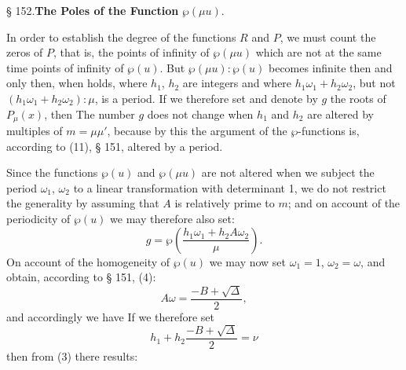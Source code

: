 
\begin{center}
§ 152.\qquad \textbf{The Poles of the Function} $\wp(\mu u)$.
\end{center}

In order to establish the degree of the functions $R$ and $P$, we must count the zeros of $P$, that is, the points of infinity of $\wp(\mu u)$ which are not at the same time points of infinity of $\wp(u)$. But $\wp(\mu u):\wp(u)$ becomes infinite then and only then, when
holds, where $h_1$, $h_2$ are integers and where $h_1\omega_1 + h_2\omega_2$, but not $(h_1\omega_1+h_2\omega_2):\mu$, is a period. If we therefore set
and denote by $g$ the roots of $P_\mu(x)$, then
The number $g$ does not change when $h_1$ and $h_2$ are altered by multiples of $m=\mu\mu'$, because by this the argument of the $\wp$-functions is, according to (11), § 151, altered by a period.

Since the functions $\wp(u)$ and $\wp(\mu u)$ are not altered when we subject the period $\omega_1$, $\omega_2$ to a linear transformation with determinant 1, we do not restrict the generality by assuming that $A$ is relatively prime to $m$; and on account of the periodicity of $\wp(u)$ we may therefore also set:
\[ g = \wp\left(\dfrac{h_1\omega_1+h_2 A\omega_2}{\mu}\right). \]
On account of the homogeneity of $\wp(u)$ we may now set $\omega_1=1$, $\omega_2=\omega$, and obtain, according to § 151, (4):
\[ A\omega = \dfrac{-B+\sqrt{\Delta}}{2}, \]
and accordingly we have
If we therefore set
\[ h_1 + h_2\dfrac{-B+\sqrt{\Delta}}{2} = \nu \]
then from (3) there results:
